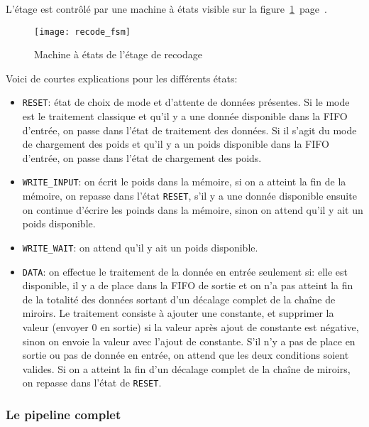 L'étage est contrôlé par une machine à états visible sur la
figure~\ref{fig:recode_fsm}~page~\pageref{fig:recode_fsm}.

\begin{figure}[h!]
	\texttt{[image: recode\_fsm]}
	\caption{Machine à états de l'étage de recodage}
	\label{fig:recode_fsm}
\end{figure}

Voici de courtes explications pour les différents états:
\begin{itemize}
	\item \verb+RESET+: état de choix de mode et d'attente de données présentes.
		Si le mode est le traitement classique et qu'il y a une donnée
		disponible dans la FIFO d'entrée, on passe dans l'état de traitement
		des données. Si il s'agit du mode de chargement des poids
		et qu'il y a un poids disponible dans la FIFO d'entrée, on passe dans l'état
		de chargement des poids.
	\item \verb+WRITE_INPUT+: on écrit le poids dans la mémoire,
		si on a atteint la fin de la mémoire, on repasse dans l'état \verb+RESET+,
		s'il y a une donnée
		disponible ensuite on continue d'écrire les poinds dans la mémoire,
		sinon on attend qu'il y ait un poids disponible.
	\item \verb+WRITE_WAIT+: on attend qu'il y ait un poids disponible.
	\item \verb+DATA+: on effectue le traitement de la donnée en entrée seulement si:
		elle est disponible, il y a de place dans la FIFO de sortie et on n'a pas atteint
		la fin de la totalité des données sortant d'un décalage complet de la chaîne
		de miroirs. Le traitement consiste à ajouter une constante, et supprimer la valeur
		(envoyer 0 en sortie) si la valeur après ajout de constante est négative, sinon on
		envoie la valeur avec l'ajout de constante.
		S'il n'y a pas de place en sortie ou pas de donnée en entrée, on attend que les deux conditions
		soient valides.
		Si on a atteint la fin d'un décalage complet de la chaîne de miroirs, on repasse dans
		l'état de \verb+RESET+.
\end{itemize}



\subsubsection{Le pipeline complet}

